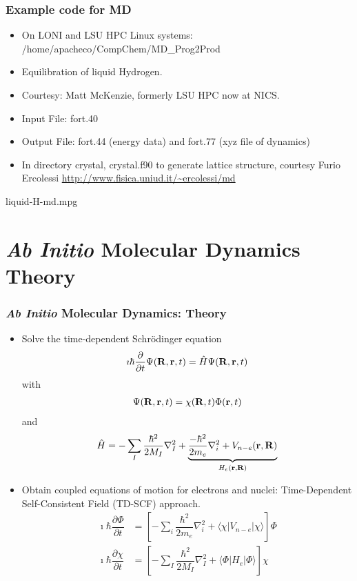 \documentclass[slidestop,mathserif,compress,xcolor=svgnames]{beamer}
\begin{document}
\begin{frame}
\frametitle{\small Example code for MD}
\begin{itemize}
\item On LONI and LSU HPC Linux systems: /home/apacheco/CompChem/MD\_Prog2Prod
\item Equilibration of liquid Hydrogen.
\item Courtesy: Matt McKenzie, formerly LSU HPC now at NICS.
\item Input File: fort.40
\item Output File: fort.44 (energy data) and fort.77 (xyz file of dynamics)
\item In directory crystal, crystal.f90 to generate lattice structure, courtesy Furio Ercolessi {\color{Blue}\url{http://www.fisica.uniud.it/~ercolessi/md}}
\end{itemize}
\begin{center}
{liquid-H-md.mpg}
\end{center}
\end{frame}

\section{{\it Ab Initio} Molecular Dynamics Theory} 
\begin{frame}
\frametitle{\small {\it Ab Initio} Molecular Dynamics: Theory}
\begin{itemize}
\item Solve the time-dependent Schr\"{o}dinger equation
\begin{align*}
\imath\hbar\dfrac{\partial}{\partial t}\Psi({\bf R},{\bf r},t) = \hat{H}\Psi({\bf R},{\bf r},t)
\end{align*}
with 
\begin{align*}
\Psi({\bf R},{\bf r},t) = \chi({\bf R},t)\Phi({\bf r},t)
\end{align*}
and 
\begin{align*}
\hat{H} = -\sum_I\dfrac{\hbar^2}{2M_I}\nabla^2_I +\underbrace{\dfrac{-\hbar^2}{2m_e}\nabla^2_i + V_{n-e}(\bf r,R)}_{H_e(\bf r,R)}
\end{align*}
\item Obtain coupled equations of motion for electrons and nuclei: Time-Dependent Self-Consistent Field (TD-SCF) approach.
\begin{align*}
\imath\hbar\dfrac{\partial\Phi}{\partial t} &= \left[-\sum_i\dfrac{\hbar^2}{2m_e}\nabla^2_i + \langle\chi|V_{n-e}|\chi\rangle\right]\Phi\\
\imath\hbar\dfrac{\partial\chi}{\partial t} &= \left[-\sum_I\dfrac{\hbar^2}{2M_I}\nabla^2_I + \langle\Phi|H_e|\Phi\rangle\right]\chi
\end{align*}
\end{itemize}
\end{frame}
\end{document}
